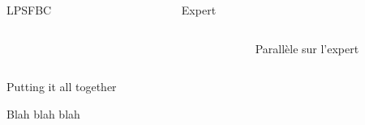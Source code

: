 \documentclass[xcolor=x11names,12pt]{beamer}
\newenvironment{WholeWidthBox}[1]{
  \begin{columns}
    \begin{column}{0.98\textwidth}
      \begin{block}{#1}
        \begin{hfill}
}{
        \end{hfill}
      \end{block}
    \end{column}
  \end{columns}
}
\begin{document}
\begin{frame}
\begin{columns}
\begin{column}{.48\textwidth}
\begin{block}{LPSFBC}
    \end{block}
    \end{column}
    
    \begin{column}{.48\textwidth}
\begin{block}{Expert}
  \begin{columns}
    \begin{column}{0.001\textwidth}
      \vspace{8cm}
    \end{column}
    \begin{column}{\textwidth}
      \centering
      Parallèle sur l'expert
    \end{column}
  \end{columns}
\end{block}

    \end{column}
  \end{columns}
\vfill

\begin{WholeWidthBox}{Putting it all together}
  \centering
  Blah blah blah
\end{WholeWidthBox}


\end{frame}
\end{document}
